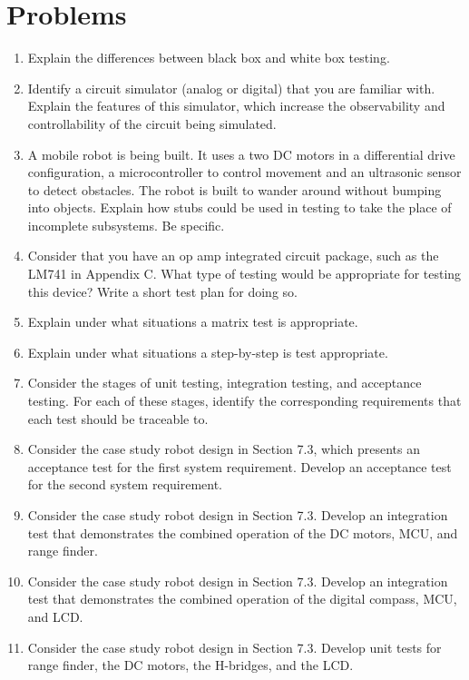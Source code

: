 \section{Problems}
\label{section:problems}

\begin{enumerate}
\def\labelenumi{\arabic{enumi}.}
\item
  Explain the differences between black box and white box testing.
\item
  Identify a circuit simulator (analog or digital) that you are familiar
  with. Explain the features of this simulator, which increase the
  observability and controllability of the circuit being simulated.
\item
  A mobile robot is being built. It uses a two DC motors in a
  differential drive configuration, a microcontroller to control
  movement and an ultrasonic sensor to detect obstacles. The robot is
  built to wander around without bumping into objects. Explain how stubs
  could be used in testing to take the place of incomplete subsystems.
  Be specific.
\item
  Consider that you have an op amp integrated circuit package, such as
  the LM741 in Appendix C. What type of testing would be appropriate for
  testing this device? Write a short test plan for doing so.
\item
  Explain under what situations a matrix test is appropriate.
\item
  Explain under what situations a step-by-step is test appropriate.
\item
  Consider the stages of unit testing, integration testing, and
  acceptance testing. For each of these stages, identify the
  corresponding requirements that each test should be traceable to.
\item
  Consider the case study robot design in Section 7.3, which presents an
  acceptance test for the first system requirement. Develop an
  acceptance test for the second system requirement.
\item
  Consider the case study robot design in Section 7.3. Develop an
  integration test that demonstrates the combined operation of the DC
  motors, MCU, and range finder.
\item
  Consider the case study robot design in Section 7.3. Develop an
  integration test that demonstrates the combined operation of the
  digital compass, MCU, and LCD.
\item
  Consider the case study robot design in Section 7.3. Develop unit
  tests for range finder, the DC motors, the H-bridges, and the LCD.

\end{enumerate}

